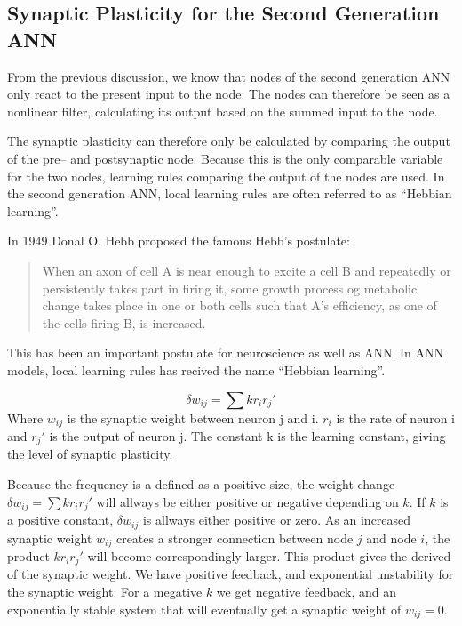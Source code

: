 	\subsection{Synaptic Plasticity for the Second Generation ANN} %
	\label{ssecSynPlastFor2gANN}
	From the previous discussion, we know that nodes of the second generation ANN only react to the present input to the node.
	The nodes can therefore be seen as a nonlinear filter, calculating its output based on the summed input to the node.

	The synaptic plasticity can therefore only be calculated by comparing the output of the pre-- and postsynaptic node.
	Because this is the only comparable variable for the two nodes, learning rules comparing the output of the nodes are used. %
	In the second generation ANN, local learning rules are often referred to as ``Hebbian learning''.

	In 1949 Donal O. Hebb proposed the famous Hebb's postulate:
 	\begin{quote}
	When an axon of cell A is near enough to excite a cell B and repeatedly or persistently takes part in firing it, 
		some growth process og metabolic change takes place in one or both cells such that A's efficiency, as one of the cells firing B, is increased.\cite{Hebb1949Kap4}
	\end{quote}

	This has been an important postulate for neuroscience as well as ANN.
	In ANN models, local learning rules has recived the name ``Hebbian learning''.

	\begin{equation}
		\delta w_{ij} = \sum{k r_i r_j'}
	\end{equation}
 	Where $w_{ij}$ is the synaptic weight between neuron j and i. 
	$r_i$ is the rate of neuron i and $r_j'$ is the output of neuron j. 
	The constant \mbox{k} is the learning constant, giving the level of synaptic plasticity. 

	Because the frequency is a defined as a positive size, the weight change $\delta w_{ij} = \sum{k r_i r_j'}$ will allways be either positive or negative depending on $k$. 
	If $k$ is a positive constant, $\delta w_{ij}$ is allways either positive or zero.
	As an increased synaptic weight $w_{ij}$ creates a stronger connection between node $j$ and node $i$, the product $k r_i r_j'$ will become correspondingly larger.
	This product gives the derived of the synaptic weight.
	We have positive feedback, and exponential unstability for the synaptic weight.
	For a megative $k$ we get negative feedback, and an exponentially stable system that will eventually get a synaptic weight of $w_{ij}=0$.

